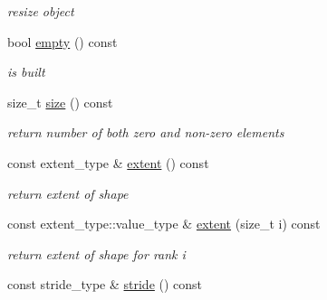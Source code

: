 \begin{DoxyCompactItemize}
\begin{DoxyCompactList}\small\item\em resize object \item\end{DoxyCompactList}\item 
\hypertarget{classbtas_1_1_sp_tensor_a05fb943de0a4069ebcb6417d998978c2}{
bool \hyperlink{classbtas_1_1_sp_tensor_a05fb943de0a4069ebcb6417d998978c2}{empty} () const }
\label{classbtas_1_1_sp_tensor_a05fb943de0a4069ebcb6417d998978c2}

\begin{DoxyCompactList}\small\item\em is built \item\end{DoxyCompactList}\item 
\hypertarget{classbtas_1_1_sp_tensor_a0ee3738ed0cce061915aebfd7482e782}{
size\_\-t \hyperlink{classbtas_1_1_sp_tensor_a0ee3738ed0cce061915aebfd7482e782}{size} () const }
\label{classbtas_1_1_sp_tensor_a0ee3738ed0cce061915aebfd7482e782}

\begin{DoxyCompactList}\small\item\em return number of both zero and non-\/zero elements \item\end{DoxyCompactList}\item 
\hypertarget{classbtas_1_1_sp_tensor_abc8938d3140efe5adc8eeef3060f1d3c}{
const extent\_\-type \& \hyperlink{classbtas_1_1_sp_tensor_abc8938d3140efe5adc8eeef3060f1d3c}{extent} () const }
\label{classbtas_1_1_sp_tensor_abc8938d3140efe5adc8eeef3060f1d3c}

\begin{DoxyCompactList}\small\item\em return extent of shape \item\end{DoxyCompactList}\item 
\hypertarget{classbtas_1_1_sp_tensor_a3c4349674d8308e2773cae05f430ca43}{
const extent\_\-type::value\_\-type \& \hyperlink{classbtas_1_1_sp_tensor_a3c4349674d8308e2773cae05f430ca43}{extent} (size\_\-t i) const }
\label{classbtas_1_1_sp_tensor_a3c4349674d8308e2773cae05f430ca43}

\begin{DoxyCompactList}\small\item\em return extent of shape for rank i \item\end{DoxyCompactList}\item 
\hypertarget{classbtas_1_1_sp_tensor_a2483cd78f66529ca587a352c9330b558}{
const stride\_\-type \& \hyperlink{classbtas_1_1_sp_tensor_a2483cd78f66529ca587a352c9330b558}{stride} () const }
\label{classbtas_1_1_sp_tensor_a2483cd78f66529ca587a352c9330b558}


\end{DoxyCompactItemize}
